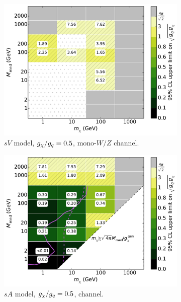 \begin{figure}
\begin{subfigure}[t]{0.32\textwidth}
    \centering
    \includegraphics[width=1.\textwidth]{figures/grid_basepoints_SVD_rat05_monoWZ.pdf}
    \caption{$sV$ model, $g_{\chi}/g_q = 0.5$, mono-$W/Z$ channel.}
    \vspace{0.75cm}
  \end{subfigure}
  \begin{subfigure}[t]{0.32\textwidth}
    \centering
    \includegraphics[width=1.\textwidth]{figures/grid_basepoints_SAD_rat05_monojet.pdf}
    \caption{$sA$ model, $g_{\chi}/g_q = 0.5$, \monojet channel.}
  \end{subfigure}
  \begin{subfigure}[t]{0.32\textwidth}
    \centering

\end{subfigure}
\end{figure}
